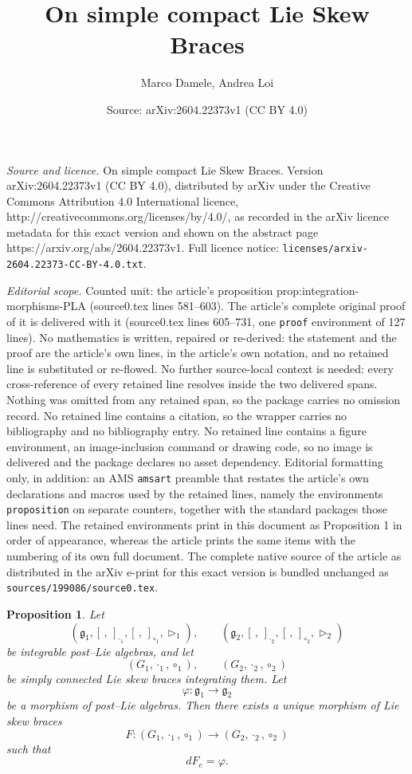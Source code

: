 \documentclass[10pt,a4paper]{amsart}
\title{On simple compact Lie Skew Braces}
\author{Marco Damele, Andrea Loi}
\date{Source: arXiv:2604.22373v1 (CC BY 4.0)}
\newtheorem{proposition}{Proposition}
\begin{document}
\maketitle

\noindent\emph{Source and licence.} On simple compact Lie Skew Braces. Version arXiv:2604.22373v1 (CC BY 4.0), distributed by arXiv under the Creative Commons Attribution 4.0 International licence, http://creativecommons.org/licenses/by/4.0/, as recorded in the arXiv licence metadata for this exact version and shown on the abstract page https://arxiv.org/abs/2604.22373v1. Full licence notice: \texttt{licenses/arxiv-2604.22373-CC-BY-4.0.txt}.\par\smallskip

\noindent\textit{Editorial scope.} Counted unit: the article's proposition prop:integration-morphisms-PLA (source0.tex lines 581--603). The article's complete original proof of it is delivered with it (source0.tex lines 605--731, one \texttt{proof} environment of 127 lines). No mathematics is written, repaired or re-derived: the statement and the proof are the article's own lines, in the article's own notation, and no retained line is substituted or re-flowed.  No further source-local context is needed: every cross-reference of every retained line resolves inside the two delivered spans.  Nothing was omitted from any retained span, so the package carries no omission record.  No retained line contains a citation, so the wrapper carries no bibliography and no bibliography entry.  No retained line contains a figure environment, an image-inclusion command or drawing code, so no image is delivered and the package declares no asset dependency.  Editorial formatting only, in addition: an AMS \texttt{amsart} preamble that restates the article's own declarations and macros used by the retained lines, namely the environments \texttt{proposition} on separate counters, together with the standard packages those lines need.  The retained environments print in this document as Proposition 1 in order of appearance, whereas the article prints the same items with the numbering of its own full document.  The complete native source of the article as distributed in the arXiv e-print for this exact version is bundled unchanged as \texttt{sources/199086/source0.tex}.
\begin{proposition}\label{prop:integration-morphisms-PLA}
Let
\[
(\mathfrak g_1,[\, ,\,]_{\cdot_1},[\, ,\,]_{\circ_1},\triangleright_1), \qquad
(\mathfrak g_2,[\, ,\,]_{\cdot_2},[\, ,\,]_{\circ_2},\triangleright_2)
\]
be integrable post--Lie algebras, and let
\[
(G_1,\cdot_1,\circ_1), \qquad (G_2,\cdot_2,\circ_2)
\]
be simply connected Lie skew braces integrating them. Let
\[
\varphi:\mathfrak g_1 \longrightarrow \mathfrak g_2
\]
be a morphism of post--Lie algebras. Then there exists a unique morphism of Lie skew braces
\[
F:(G_1,\cdot_1,\circ_1)\longrightarrow (G_2,\cdot_2,\circ_2)
\]
such that
\[
dF_e=\varphi.
\]
\end{proposition}
\end{document}

